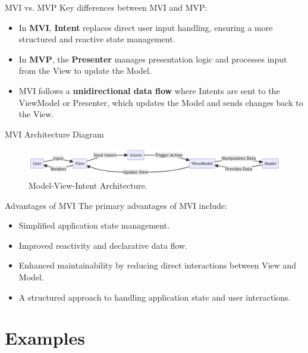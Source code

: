 \documentclass[aspectratio=169, table]{beamer}
\begin{document}
\begin{frame}[fragile]{MVI vs. MVP}
	\vspace{20pt}
	Key differences between MVI and MVP:
	\begin{itemize}
		\item In \textbf{MVI}, \textbf{Intent} replaces direct user input handling, ensuring a more structured and reactive state management.
		\item In \textbf{MVP}, the \textbf{Presenter} manages presentation logic and processes input from the View to update the Model.
		\item MVI follows a \textbf{unidirectional data flow} where Intents are sent to the ViewModel or Presenter, which updates the Model and sends changes back to the View.
	\end{itemize}
\end{frame}

\begin{frame}[fragile]{MVI Architecture Diagram}
	\vspace{20pt}
	\begin{figure}[h]
		\centering
		\includegraphics[width=\textwidth]{../images/mvi.png}
		\caption{Model-View-Intent Architecture.}
		\label{fig:mvi-architecture}
	\end{figure}
\end{frame}

\begin{frame}[fragile]{Advantages of MVI}
	\vspace{20pt}
	The primary advantages of MVI include:
	\begin{itemize}
		\item Simplified application state management.
		\item Improved reactivity and declarative data flow.
		\item Enhanced maintainability by reducing direct interactions between View and Model.
		\item A structured approach to handling application state and user interactions.
	\end{itemize}
\end{frame}

\section{Examples}
\end{document}
